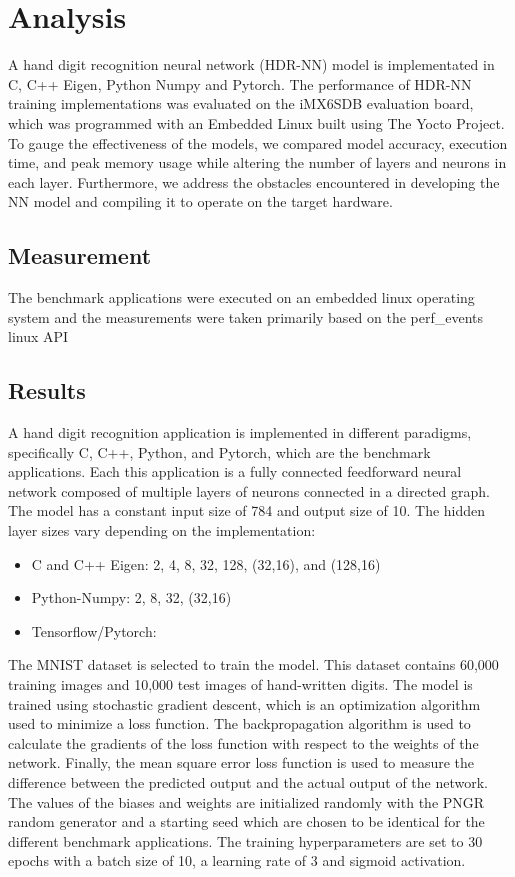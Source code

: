 \part{Analysis}

A hand digit recognition neural network (HDR-NN) model is implementated in C, C++ Eigen, Python Numpy and Pytorch. The performance of HDR-NN training implementations was evaluated on the iMX6SDB evaluation board, which was programmed with an Embedded Linux built using The Yocto Project. To gauge the effectiveness of the models, we compared model accuracy, execution time, and peak memory usage while altering the number of layers and neurons in each layer. Furthermore, we address the obstacles encountered in developing the NN model and compiling it to operate on the target hardware. 


\chapter{Measurement}

The benchmark applications were executed on an embedded linux operating system and the measurements were taken primarily based on the perf\_events linux API

\chapter{Results}
A hand digit recognition application is implemented in different paradigms, specifically C, C++, Python, and Pytorch, which are the benchmark applications. Each this application is a fully connected feedforward neural network composed of multiple layers of neurons connected in a directed graph. The model has a constant input size of 784 and output size of 10. The hidden layer sizes vary depending on the implementation:
\begin{itemize}
	\item C and C++ Eigen: 2, 4, 8, 32, 128, (32,16), and (128,16)
	\item Python-Numpy: 2, 8, 32, (32,16)
	\item Tensorflow/Pytorch:
\end{itemize}
The MNIST dataset is selected to train the model. This dataset contains 60,000 training images and 10,000 test images of hand-written digits. The model is trained using stochastic gradient descent, which is an optimization algorithm used to minimize a loss function. The backpropagation algorithm is used to calculate the gradients of the loss function with respect to the weights of the network. Finally, the mean square error loss function is used to measure the difference between the predicted output and the actual output of the network. The values of the biases and weights are initialized randomly with the PNGR random generator and a starting seed which are chosen to be identical for the different benchmark applications. The training hyperparameters are set to 30 epochs with a batch size of 10, a learning rate of 3 and sigmoid activation.  

